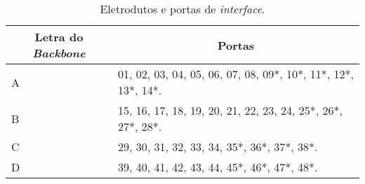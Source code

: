 \begin{table}[h!]
	\centering
\caption{Eletrodutos e portas de \textit{interface}.}
\label{tab4}
	\renewcommand{\arraystretch}{1.2}
	\begin{tabular}{|l|l|}
		\hline
		\multicolumn{1}{|c|}{\textbf{Letra do \textit{Backbone}}} &	 \multicolumn{1}{|c|}{\textbf{Portas}}                                 		  \\ \hline		A                                
		& 01, 02, 03, 04, 05, 06, 07, 08, 09*, 10*, 11*, 12*, 13*, 14*.                                             \\ \hline
		B                               
		& 15, 16, 17, 18, 19, 20, 21, 22, 23, 24, 25*, 26*, 27*, 28*.         					\\ \hline
		C                                  
		& 29, 30, 31, 32, 33, 34, 35*, 36*, 37*, 38*.          \\ \hline
		D 
		& 39, 40, 41, 42, 43, 44, 45*, 46*, 47*, 48*.         \\ \hline
		
	\end{tabular}
\end{table}
